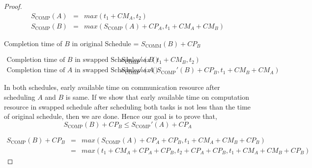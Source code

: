 \documentclass[sigconf]{acmart}
\newcommand{\scomm}{\ensuremath{{S}_{\text{COMM}}}}
\newcommand{\scomp}{\ensuremath{{S}_{\text{COMP}}}}
\begin{document}
\begin{proof}
	\begin{eqnarray*}
		\scomp(A) & = & max(t_1 + CM_A, t_2) \\
		\scomp(B) & = & max(\scomp(A) + CP_A,  t_1 + CM_A + CM_B)
	\end{eqnarray*}
	
	Completion time of $B$ in original Schedule = $\scomm(B) + CP_B$
	
	\begin{eqnarray*}
		\text{Completion time of $B$ in swapped Schedule, } \scomp '(B) & = & max(t_1 + CM_B, t_2)\\
		\text{Completion time of $A$ in swapped Schedule, } \scomp '(A) & = & max(\scomp'(B) + CP_B, t_1 + CM_B + CM_A)
	\end{eqnarray*}
	
	In both schedules, early available time on communication resource after scheduling $A$ and $B$ is same. If we show that early available time on computation resource in swapped schedule after scheduling both tasks is not less than the time of original schedule, then we are done. Hence our goal is to prove that,		
	$$\scomp(B) + CP_B \le \scomp'(A) + CP_A $$
	
	
	
	\begin{eqnarray*}
		\scomp(B) + CP_B & = & max(\scomp(A) + CP_A + CP_B,  t_1 + CM_A + CM_B + CP_B)\\
		& = & max(t_1 + CM_A + CP_A + CP_B, t_2 + CP_A + CP_B, t_1 + CM_A + CM_B + CP_B) 
	\end{eqnarray*}
	

\end{proof}
\end{document}
